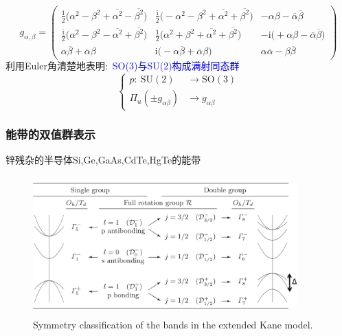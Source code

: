 {{{{\begin{displaymath}
	g_{\alpha,\beta}=
	\begin{pmatrix}
		\frac12\big(\alpha^2-\beta^2+\overline{\alpha^2}-\overline{\beta^2}\big) &\frac{\mathrm{i}}2\big(-\alpha^2-\beta^2+\overline{\alpha^2}+\overline{\beta^2}\big) &-\alpha\beta-\overline{\alpha}\overline{\beta}\\
		\frac{\mathrm{i}}2\big(\alpha^2-\beta^2-\overline{\alpha^2}+\overline{\beta^2}\big) &\frac12\big(\alpha^2+\beta^2+\overline{\alpha^2}+\overline{\beta^2}\big) &-\mathrm{i}\big(+\alpha\beta-\overline{\alpha}\overline{\beta}\big)\\
		\alpha\overline{\beta}+\overline{\alpha}\beta &\mathrm{i}\big(-\alpha\overline{\beta}+\overline{\alpha}\beta\big) &\alpha\overline{\alpha}-\beta\overline{\beta}
	\end{pmatrix}
\end{displaymath}
利用\textrm{Euler}角清楚地表明:~\textcolor{blue}{\textrm{SO(3)}与\textrm{SU(2)}构成满射同态群}
\begin{displaymath}
	\left\{
		\begin{aligned}
			p:~\mathrm{SU(2)}&\rightarrow \mathrm{SO(3)}\\
			\Pi_u(\pm g_{\alpha\beta})&\rightarrow g_{\alpha\beta}
		\end{aligned}
		\right.
\end{displaymath}
}}
}

\frame
{
	\frametitle{能带的双值群表示}
	锌残杂的半导体\textrm{Si},\textrm{Ge},\textrm{GaAs},\textrm{CdTe},\textrm{HgTe}的能带
	\begin{figure}[h!]
\centering
\vspace*{-0.10in}
\includegraphics[height=2.1in,width=4.00in,viewport=0 0 1490 730,clip]{Figures/SOC_double-group.png}
\caption{\tiny \textrm{Symmetry classification of the bands in the extended Kane model.}}%
\label{Fig:Double-Group}
\end{figure}
}

}
